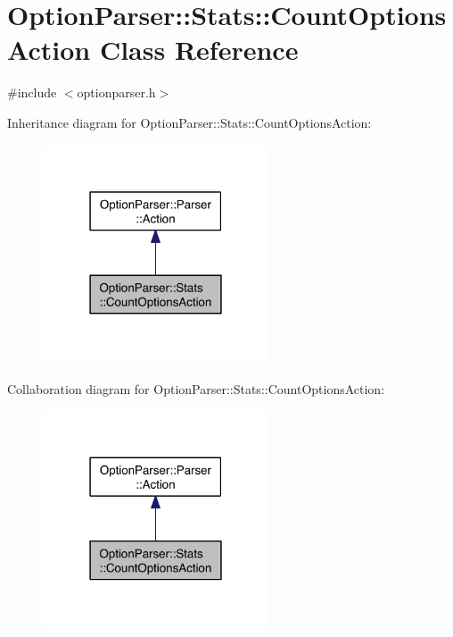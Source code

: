 \hypertarget{class_option_parser_1_1_stats_1_1_count_options_action}{\section{Option\-Parser\-:\-:Stats\-:\-:Count\-Options\-Action Class Reference}
\label{class_option_parser_1_1_stats_1_1_count_options_action}
}


{\ttfamily \#include $<$optionparser.\-h$>$}



Inheritance diagram for Option\-Parser\-:\-:Stats\-:\-:Count\-Options\-Action\-:\nopagebreak
\begin{figure}[H]
\begin{center}
\leavevmode
\includegraphics[width=190pt]{class_option_parser_1_1_stats_1_1_count_options_action__inherit__graph}
\end{center}
\end{figure}


Collaboration diagram for Option\-Parser\-:\-:Stats\-:\-:Count\-Options\-Action\-:\nopagebreak
\begin{figure}[H]
\begin{center}
\leavevmode
\includegraphics[width=190pt]{class_option_parser_1_1_stats_1_1_count_options_action__coll__graph}
\end{center}
\end{figure}

